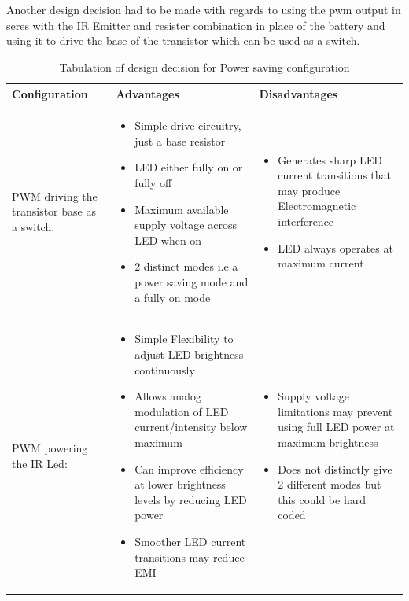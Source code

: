 \documentclass[class=report,11pt,crop=false]{standalone}
\begin{document}
Another design decision had to be made with regards to using the pwm output in seres with the IR Emitter and resister combination in place of the battery and using it to drive the base of the transistor which can be used as a switch. \\
\begin{table}[h]
  \centering
    \caption{Tabulation of design decision for Power saving configuration}
    \label{tab:Power saving configurations}
    \begin{tabular}{|>{\centering\arraybackslash}m{3cm}|m{5cm}|m{7cm}|}
      \hline
      \textbf{Configuration} & \textbf{Advantages} & \textbf{Disadvantages}\\   
      \hline
      PWM driving the transistor base as a switch: & 
      \begin{itemize}
      \item Simple drive circuitry, just a base resistor 
      \item LED either fully on or fully off
      \item Maximum available supply voltage across LED when on
      \item 2 distinct modes i.e a power saving mode and a fully on mode 
      \end{itemize} &
      \begin{itemize}
      \item Generates sharp LED current transitions that may produce Electromagnetic interference  
      \item LED always operates at maximum current
      \end{itemize}\\
      \hline
      PWM powering the IR Led: & 
      \begin{itemize}
      \item Simple Flexibility to adjust LED brightness continuously 
      \item Allows analog modulation of LED current/intensity below maximum
      \item Can improve efficiency at lower brightness levels by reducing LED power
      \item Smoother LED current transitions may reduce EMI 
      \end{itemize} &
      \begin{itemize}
      \item Supply voltage limitations may prevent using full LED power at maximum brightness 
      \item Does not distinctly give 2 different modes but this could be hard coded
      \end{itemize}\\
      \hline
    \end{tabular}
\end{table}
\end{document}
